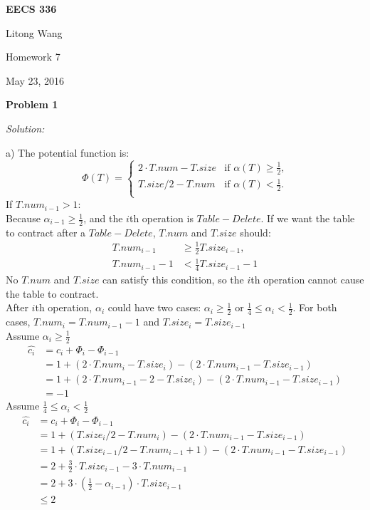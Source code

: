\documentclass[12pt,letterpaper]{article}
\def\pp{\par\noindent}
\newcommand{\problem}[1]{ \bigskip \pp \textbf{Problem #1}\par}
\newcommand{\solution}{\textit{Solution:}\par}
\begin{document}
\centerline{\bf EECS 336}

\medskip
\centerline{Litong Wang}
\centerline{Homework 7}
\centerline{May 23, 2016}
\bigskip


\problem{1}
\solution
a) The potential function is:
\begin{equation}
    \Phi(T)=
   \begin{cases}
   2 \cdot T.num - T.size &\mbox{if $\alpha(T) \ge \frac{1}{2}$,}\\
   T.size / 2 - T.num &\mbox{if $\alpha(T) < \frac{1}{2}$.}\\
   \end{cases}
\end{equation}
If $T.num_{i-1} > 1$: \\
Because $\alpha_{i-1} \ge \frac{1}{2}$, and the $i$th operation is $Table-Delete$. If we want the table to contract after a $Table-Delete$, $T.num$ and $T.size$ should:
\begin{align*}
T.num_{i-1} &\ge \frac{1}{2} T.size_{i-1}, \\
T.num_{i-1} - 1 &< \frac{1}{4} T.size_{i-1} - 1
\end{align*}
No $T.num$ and $T.size$ can satisfy this condition, so the $i$th operation cannot cause the table to contract. \\
After $i$th operation, $\alpha_{i}$ could have two cases: $\alpha_{i} \ge \frac{1}{2}$ or $\frac{1}{4} \le \alpha_{i} < \frac{1}{2}$. For both cases, $T.num_{i} = T.num_{i-1} - 1$ and $T.size_{i} = T.size_{i-1}$\\
Assume $\alpha_{i} \ge \frac{1}{2}$
\begin{align*}
\widehat{c_i} &= c_i + \Phi_{i} - \Phi_{i-1} \\
&= 1 + ( 2 \cdot T.num_{i} - T.size_{i} ) - ( 2 \cdot T.num_{i-1} - T.size_{i-1} ) \\
&= 1 + ( 2 \cdot T.num_{i-1} - 2 - T.size_{i} ) - ( 2 \cdot T.num_{i-1} - T.size_{i-1} ) \\
&= -1
\end{align*}
Assume $\frac{1}{4} \le \alpha_{i} < \frac{1}{2}$
\begin{align*}
\widehat{c_i} &= c_i + \Phi_{i} - \Phi_{i-1} \\
&= 1 + ( T.size_{i} / 2 - T.num_{i} ) - ( 2 \cdot T.num_{i-1} - T.size_{i-1} ) \\
&= 1 + ( T.size_{i-1} / 2 - T.num_{i-1} + 1) - ( 2 \cdot T.num_{i-1} - T.size_{i-1} ) \\
&= 2 + \frac{3}{2} \cdot T.size_{i-1} - 3 \cdot T.num_{i-1} \\
&= 2 + 3 \cdot (\frac{1}{2} - \alpha_{i-1}) \cdot T.size_{i-1} \\
&\le 2
\end{align*}
\end{document}
